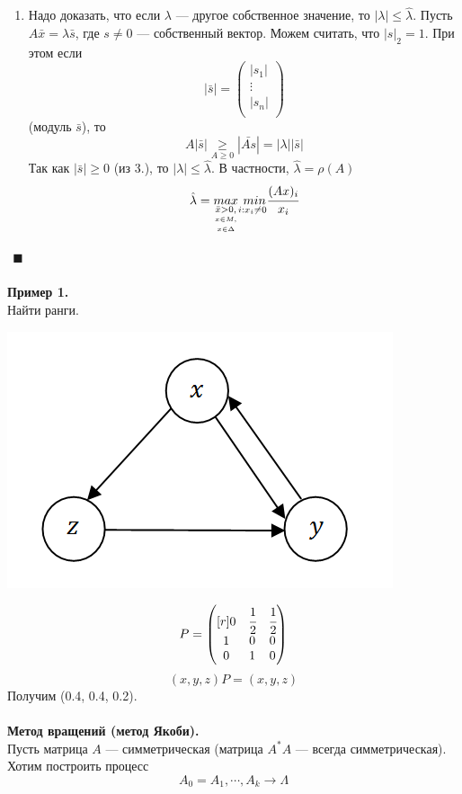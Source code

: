 \documentclass[12pt]{article}
\theoremstyle{definition}
\numberwithin{equation}{section}
\begin{document}
\begin{enumerate}
		\item Надо доказать, что если $\lambda$ --- другое собственное значение, то $|\lambda|\leqslant \hat \lambda$. Пусть $A\bar x=\lambda \bar s$, где $s\neq 0$ --- собственный вектор. Можем считать, что $|s|_2=1$. При этом если 
		\[|\bar s| = \begin{pmatrix}
		|s_1|\\
		\vdots\\
		|s_n|\\
		\end{pmatrix}\]
		(модуль $\bar s$), то $$A|\bar s| \underset{A\geqslant 0}{\geqslant} |\bar{As}|=|\lambda||\bar s|$$
		Так как $|\bar s| \geqslant 0$ (из 3.), то $|\lambda|\leqslant \hat \lambda$. В частности, $\hat \lambda=\rho(A)$
		$$\hat \lambda =\underset{\underset{x\in \Delta}{\underset{x\in M,}{\bar x>0,}}}{max} \underset{i:x_i\neq 0}{~min}\cfrac{(Ax)_i}{x_i}$$
	\end{enumerate} $~~\blacksquare$\\
	\\
	\textbf{Пример 1.}\\
	Найти ранги.
	\begin{center}
		\includegraphics[scale=0.8]{l15_5.png}\\
	\end{center}
	\[P = \begin{pmatrix}[r]
	0 & \cfrac{1}{2} & \cfrac{1}{2}\\
	1 & 0 & 0\\
	0 & 1 & 0\\
	\end{pmatrix}\]
	$$(x, y, z)P=(x, y, z)$$
	Получим (0.4, 0.4, 0.2).\\
	\\
	\textbf{Метод вращений (метод Якоби).}\\
	Пусть матрица $A$ --- симметрическая (матрица $A^*A$ --- всегда симметрическая). Хотим построить процесс $$A_0=A_1,\cdots, A_k \to \Lambda$$
\end{document}

